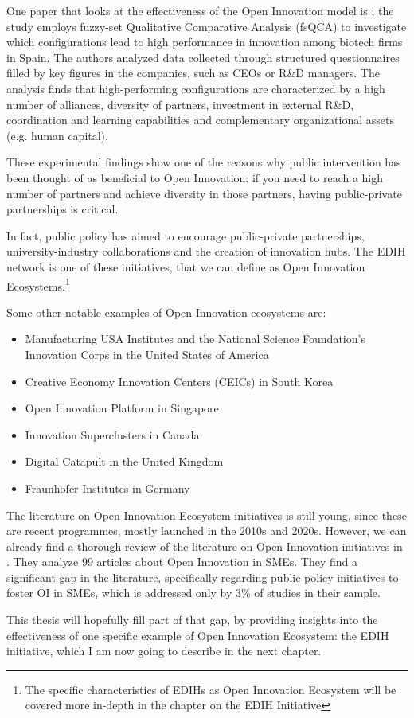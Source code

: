 \documentclass[12pt]{report}
\begin{document}
\par One paper that looks at the effectiveness of the Open Innovation model is \cite{carmonalavado2022}; the study employs fuzzy-set Qualitative Comparative Analysis (fsQCA) to investigate which configurations lead to high performance in innovation among biotech firms in Spain. The authors analyzed data collected through structured questionnaires filled by key figures in the companies, such as CEOs or R\&D managers. The analysis finds that high-performing configurations are characterized by a high number of alliances, diversity of partners, investment in external R\&D, coordination and learning capabilities and complementary organizational assets (e.g. human capital). 
\par These experimental findings show one of the reasons why public intervention has been thought of as beneficial to Open Innovation: if you need to reach a high number of partners and achieve diversity in those partners, having public-private partnerships is critical.
\par In fact, public policy has aimed to encourage public-private partnerships, university-industry collaborations and the creation of innovation hubs. The EDIH network is one of these initiatives, that we can define as Open Innovation Ecosystems.\footnote{The specific characteristics of EDIHs as Open Innovation Ecosystem will be covered more in-depth in the chapter on the EDIH Initiative}
\par Some other notable examples of Open Innovation ecosystems are:
\begin{itemize}
    \item Manufacturing USA Institutes and the National Science Foundation's Innovation Corps in the United States of America
    \item Creative Economy Innovation Centers (CEICs) in South Korea
    \item Open Innovation Platform in Singapore
    \item Innovation Superclusters in Canada
    \item Digital Catapult in the United Kingdom
    \item Fraunhofer Institutes in Germany
\end{itemize}
\par The literature on Open Innovation Ecosystem initiatives is still young, since these are recent programmes, mostly launched in the 2010s and 2020s. However, we can already find a thorough review of the literature on Open Innovation initiatives in \cite{IdrissiFakhreddine2023}. They analyze 99 articles about Open Innovation in SMEs. They find a significant gap in the literature, specifically regarding public policy initiatives to foster OI in SMEs, which is addressed only by 3\% of studies in their sample. 
\par This thesis will hopefully fill part of that gap, by providing insights into the effectiveness of one specific example of Open Innovation Ecosystem: the EDIH initiative, which I am now going to describe in the next chapter.
\end{document}
